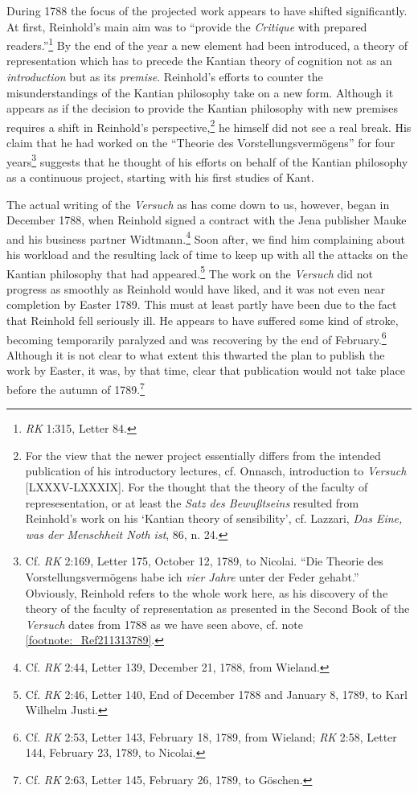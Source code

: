 During 1788 the focus of the projected work appears to have shifted significantly. At first, Reinhold's main aim was to ``provide the \textit{Critique} with prepared readers.''\footnote{ \textit{RK} 1:315, Letter 84.} By the end of the year a new element had been introduced, a theory of representation which has to precede the Kantian theory of cognition not as an \textit{introduction} but as its \textit{premise}. Reinhold's efforts to counter the misunderstandings of the Kantian philosophy take on a new form. Although it appears as if the decision to provide the Kantian philosophy with new premises requires a shift in Reinhold's perspective,\footnote{ For the view that the newer project essentially differs from the intended publication of his introductory lectures, cf. Onnasch, introduction to \textit{Versuch} [LXXXV{-}LXXXIX]. For the thought that the theory of the faculty of represesentation, or at least the \textit{Satz des Bewu\ss{}tseins} resulted from Reinhold's work on his `Kantian theory of sensibility', cf. Lazzari, \textit{Das Eine, was der Menschheit Noth ist}, 86, n. 24.} he himself did not see a real break. His claim that he had worked on the ``Theorie des Vorstellungsverm\"{o}gens'' for four years\footnote{\label{footnote:_Ref213408642} Cf. \textit{RK} 2:169, Letter 175, October 12, 1789, to Nicolai. ``Die Theorie des Vorstellungsverm\"{o}gens habe ich \textit{vier Jahre} unter der Feder gehabt.'' Obviously, Reinhold refers to the whole work here, as his discovery of the theory of the faculty of representation as presented in the Second Book of the \textit{Versuch} dates from 1788 as we have seen above, cf. note \ref{footnote:_Ref211313789}. } suggests that he thought of his efforts on behalf of the Kantian philosophy as a continuous project, starting with his first studies of Kant.

 The actual writing of the \textit{Versuch} as has come down to us, however, began in December 1788, when Reinhold signed a contract with the Jena publisher Mauke and his business partner Widtmann.\footnote{ Cf. \textit{RK} 2:44, Letter 139, December 21, 1788, from Wieland. } Soon after, we find him complaining about his workload and the resulting lack of time to keep up with all the attacks on the Kantian philosophy that had appeared.\footnote{ Cf. \textit{RK} 2:46, Letter 140, End of December 1788 and January 8, 1789, to Karl Wilhelm Justi. } The work on the \textit{Versuch }did not progress as smoothly as Reinhold would have liked, and it was not even near completion by Easter 1789. This must at least partly have been due to the fact that Reinhold fell seriously ill. He appears to have suffered some kind of stroke, becoming temporarily paralyzed and was recovering by the end of February.\footnote{ Cf. \textit{RK} 2:53, Letter 143, February 18, 1789, from Wieland; \textit{RK} 2:58, Letter 144, February 23, 1789, to Nicolai. } Although it is not clear to what extent this thwarted the plan to publish the work by Easter, it was, by that time, clear that publication would not take place before the autumn of 1789.\footnote{ Cf. \textit{RK} 2:63, Letter 145, February 26, 1789, to G\"{o}schen. } 

